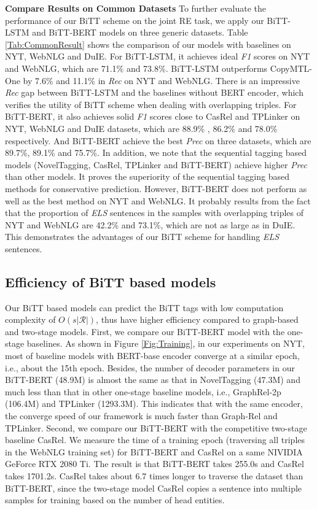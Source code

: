 \documentclass[conference]{IEEEtran}
\newcommand{\yankun}[1]{\textcolor{black}{#1}}
\begin{document}
\textbf{Compare Results on Common Datasets} To further evaluate the performance of our BiTT scheme on the joint RE task, we apply our BiTT-LSTM and BiTT-BERT models on three generic datasets. Table \ref{Tab:CommonResult} shows the comparison of our models with baselines on NYT, WebNLG and DuIE.
For BiTT-LSTM, it achieves ideal \emph{F1} scores on NYT and WebNLG, which are 71.1\% and 73.8\%. BiTT-LSTM outperforms CopyMTL-One by 7.6\% and 11.1\% in \emph{Rec} on NYT and WebNLG. There is an impressive \emph{Rec} gap between BiTT-LSTM and the baselines without BERT encoder, which verifies the utility of BiTT scheme when dealing with overlapping triples. For BiTT-BERT, it also achieves solid \emph{F1} scores close to CasRel and TPLinker on NYT, WebNLG and DuIE datasets, which are 88.9\% , 86.2\% and 78.0\% respectively. And BiTT-BERT achieve the best \emph{Prec} on three datasets, which are 89.7\%, 89.1\% and 75.7\%. In addition, we note that the sequential tagging based models (NovelTagging, CasRel, TPLinker and BiTT-BERT) achieve higher \emph{Prec} than other models. It proves the superiority of the sequential tagging based methods for conservative prediction. However, BiTT-BERT does not perform as well as the best method on NYT and WebNLG. It probably results from the fact that the proportion of \emph{ELS} sentences in the samples with overlapping triples of NYT and WebNLG are 42.2\% and 73.1\%, which are not as large as in DuIE. This demonstrates the advantages of our BiTT scheme for handling \emph{ELS} sentences.

\subsection{Efficiency of BiTT based models} Our BiTT based models can predict the BiTT tags with low computation complexity of $O(s|\mathcal{R}|)$, thus have higher efficiency compared to graph-based and two-stage models. First, we compare our BiTT-BERT model with the one-stage baselines. As shown in Figure \ref{Fig:Training}, in our experiments on NYT, most of baseline models with BERT-base encoder converge at a similar epoch, i.e., about the 15th epoch. 
Besides, the number of decoder parameters in our BiTT-BERT (48.9M) is almost the same as that in NovelTagging (47.3M) and much less than that in other one-stage baseline models, i.e., GraphRel-2p (106.4M) and TPLinker (1293.3M). This indicates that with the same encoder, the converge speed of our framework is much faster than Graph-Rel and TPLinker.
Second, we compare \yankun{our} BiTT-BERT with the competitive two-stage baseline CasRel. We measure the time of a training epoch (traversing all triples in the WebNLG training set) for BiTT-BERT and CasRel on a same NIVIDIA GeForce RTX 2080 Ti. The result is that BiTT-BERT takes 255.0s and CasRel takes 1701.2s. CasRel takes about 6.7 times longer to traverse the dataset than BiTT-BERT, since the two-stage model CasRel copies a sentence into multiple samples for training based on the number of head entities.
\end{document}
